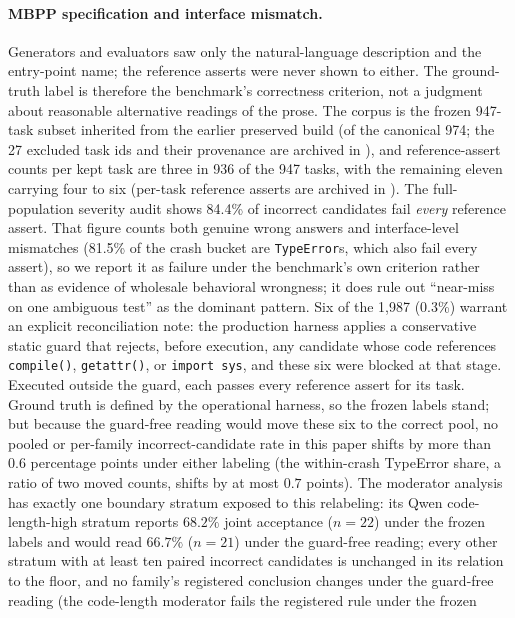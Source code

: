 \documentclass[a4paper,journal]{IAENGtran}
\begin{document}
\paragraph{MBPP specification and interface mismatch.} Generators and evaluators saw
only the natural-language description and the entry-point name; the reference
asserts were never shown to either. The ground-truth label is therefore the benchmark's
correctness criterion, not a judgment about reasonable alternative readings of the
prose. The corpus is the frozen 947-task subset inherited from the earlier preserved
build (of the canonical 974; the 27 excluded task ids and their provenance are archived
in ), and reference-assert counts per kept task are three in 936 of
the 947 tasks, with the remaining eleven carrying four to six (per-task reference
asserts are archived in ). The full-population severity audit shows 84.4\% of incorrect
candidates fail \emph{every} reference assert. That figure counts both genuine wrong
answers and interface-level mismatches (81.5\% of the crash bucket are
\texttt{TypeError}s, which also fail every assert), so we report it as
failure under the benchmark's own criterion rather than as evidence of wholesale
behavioral wrongness; it does rule out ``near-miss on one ambiguous test'' as the
dominant pattern. Six of the 1,987 (0.3\%) warrant an explicit reconciliation note:
the production harness applies a conservative static guard that rejects, before
execution, any candidate whose code references \texttt{compile()},
\texttt{getattr()}, or \texttt{import sys}, and these six were blocked at that
stage. Executed outside the guard, each passes every reference assert for its
task. Ground truth is defined by the operational harness, so the frozen labels
stand; but because the guard-free reading would move these six to the correct
pool, no pooled or per-family incorrect-candidate rate in this paper shifts by
more than $0.6$ percentage points under either labeling (the within-crash
TypeError share, a ratio of two moved counts, shifts by at most $0.7$ points).
The moderator analysis
has exactly one boundary stratum exposed to this relabeling: its Qwen code-length-high
stratum reports $68.2\%$ joint acceptance ($n=22$) under the frozen labels and would
read $66.7\%$ ($n=21$) under the guard-free reading; every other stratum with at
least ten paired incorrect candidates is unchanged in its relation to the floor,
and no family's registered conclusion changes under the guard-free reading
(the code-length moderator fails the registered rule under the frozen
\end{document}
